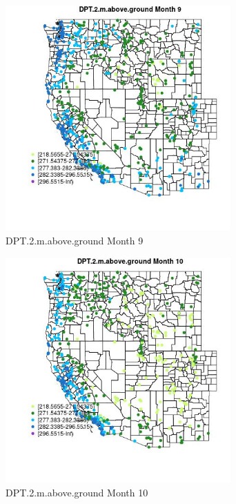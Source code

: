 \begin{figure} 
\centering  
\includegraphics[width=0.77\textwidth]{Code_Outputs/Report_ML_input_PM25_Step4_part_e_de_duplicated_aves_compiled_2019-05-14wNAs_MapObsMo9DPT2maboveground.jpg} 
\caption{\label{fig:Report_ML_input_PM25_Step4_part_e_de_duplicated_aves_compiled_2019-05-14wNAsMapObsMo9DPT2maboveground}DPT.2.m.above.ground Month 9} 
\end{figure} 
 

\begin{figure} 
\centering  
\includegraphics[width=0.77\textwidth]{Code_Outputs/Report_ML_input_PM25_Step4_part_e_de_duplicated_aves_compiled_2019-05-14wNAs_MapObsMo10DPT2maboveground.jpg} 
\caption{\label{fig:Report_ML_input_PM25_Step4_part_e_de_duplicated_aves_compiled_2019-05-14wNAsMapObsMo10DPT2maboveground}DPT.2.m.above.ground Month 10} 
\end{figure} 
 

